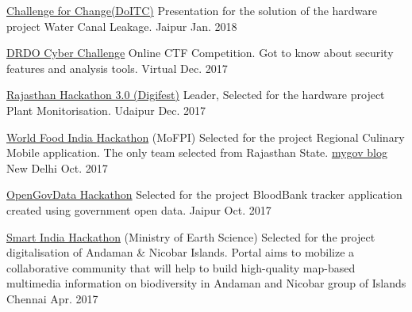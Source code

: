 
\begin{cvhonors}
  \cvhonor
	{\href{http://change.rajasthan.gov.in/catches/index}{Challenge for Change(DoITC)}} %
	{Presentation for the solution of the hardware project Water Canal Leakage.} %
	{Jaipur} %
	{Jan. 2018} %

  \cvhonor
	{\href{https://innovate.mygov.in/drdo-cyberchallenge/}{DRDO Cyber Challenge}} %
	{Online CTF Competition. Got to know about security features and analysis tools.} %
	{Virtual} %
	{Dec. 2017} %

  \cvhonor
	{\href{http://digifest.rajasthan.gov.in/udaipurhackathon.aspx}{Rajasthan Hackathon 3.0 (Digifest)}} %
	{Leader, Selected for the hardware project Plant Monitorisation.} %
	{Udaipur} %
	{Dec. 2017} %

  \cvhonor
	{\href{https://innovate.mygov.in/world-food-india-hackathon-2017/}{World Food India Hackathon} (MoFPI)} %
	{Selected for the project Regional Culinary Mobile application. The only team selected from Rajasthan State. \href{https://blog.mygov.in/announcing-shortlisted-entries-for-world-food-india-hackathon-2017-final-round/}{mygov blog}} %
	{New Delhi} %
	{Oct. 2017} %

  \cvhonor
    {\href{https://event.data.gov.in/challenges/opengovdatahack-jaipur/}{OpenGovData Hackathon}} %
    {Selected for the project BloodBank tracker application created using government open data.} %
    {Jaipur} %
    {Oct. 2017} %

  \cvhonor
    {\href{https://innovate.mygov.in/sih2017/}{Smart India Hackathon} (Ministry of Earth Science)} %
    {Selected for the project digitalisation of Andaman \& Nicobar Islands. Portal aims to mobilize a collaborative community that will help to build high-quality map-based multimedia information on biodiversity in Andaman and Nicobar group of Islands } %
    {Chennai} %
    {Apr. 2017} %

\end{cvhonors}


